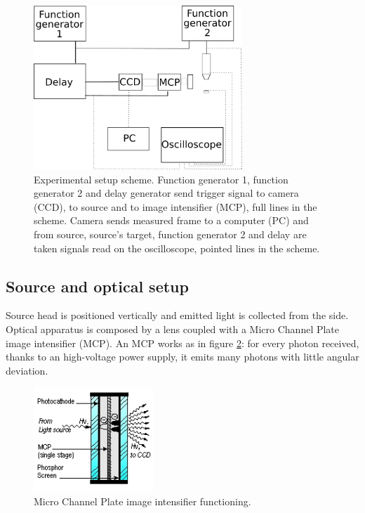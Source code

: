 \begin{figure}
 \centering
 \includegraphics[width=0.7\textwidth]{Images/Shape/acq_ottica.png}
 \caption{Experimental setup scheme. Function generator 1, function generator 2 and delay generator send trigger signal to camera (CCD), to source and to image intensifier (MCP), full lines in the scheme. Camera sends measured frame to a computer (PC) and from source, source's target, function generator 2 and delay are taken signals read on the oscilloscope, pointed lines in the scheme.}
 \label{fig:schemashape}
\end{figure}



\subsection{Source and optical setup}
Source head is positioned vertically and emitted light is collected from the side.
Optical apparatus is composed by a lens %
 coupled with a Micro Channel Plate image intensifier (MCP). An MCP works as in figure \ref{fig:MCP}: for every photon received, thanks to an high-voltage power supply, it emits many photons with little angular deviation.
\begin{figure}
 \centering
 \includegraphics[width=0.4\textwidth]{Images/Shape/MCPsingle-stage.jpg}
 \caption{Micro Channel Plate image intensifier functioning.}
 \label{fig:MCP}
\end{figure}

